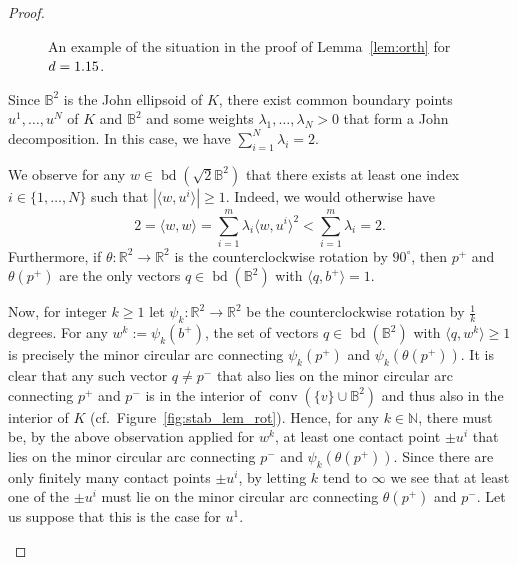 \documentclass[12pt,a4paper]{article}
\theoremstyle{definition}
\DeclareMathOperator{\conv}{conv}
\DeclareMathOperator{\bd}{bd}
\newcommand\R{\mathbb{R}}
\newcommand\B{\mathbb{B}}
\newcommand\N{\mathbb{N}}
\def\ds{1.5/\scale pt}
\begin{document}
\begin{proof}
\begin{figure}[ht]
%
\caption{
An example of the situation in the proof of Lemma~\ref{lem:orth} for $d = \d$.
}
%
\label{fig:stab_lem_points}
\end{figure}



Since $\B^2$ is the John ellipsoid of $K$, there exist common boundary points $u^1, \ldots, u^N$ of $K$ and $\B^2$ and some weights $\lambda_1, \ldots, \lambda_N > 0$ that form a John decomposition. In this case, we have $\sum_{i=1}^N \lambda_i = 2$.

We observe for any $w \in \bd(\sqrt{2} \B^2)$ that there exists at least one index $i \in \{1, \ldots, N\}$ such that $|\langle w, u^i \rangle| \geq 1$. Indeed, we would otherwise have
$$ 2 = \langle w, w \rangle = \sum_{i=1}^m \lambda_i \langle w, u^i \rangle^2 < \sum_{i=1}^m \lambda_i = 2. $$
Furthermore, if $\theta: \R^2 \to \R^2$ is the counterclockwise rotation by $90^\circ$, then $p^+$ and $\theta(p^+)$ are the only vectors $q \in \bd(\B^2)$ with $\langle q, b^+ \rangle = 1$.

Now, for integer $k \geq 1$ let $\psi_k: \R^2 \to \R^2$ be the counterclockwise rotation by $\frac{1}{k}$ degrees. For any $w^k := \psi_k(b^+)$, the set of vectors $q \in \bd(\B^2)$ with $\langle q, w^k \rangle \geq 1$ is precisely the minor circular arc connecting $\psi_k(p^+)$ and $\psi_k(\theta(p^+))$. It is clear that any such vector $q \neq p^-$ that also lies on the minor circular arc connecting $p^+$ and $p^-$ is in the interior of $\conv(\{v\} \cup \B^2)$ and thus also in the interior of $K$ (cf.~Figure~\ref{fig:stab_lem_rot}). Hence, for any $k \in \N$, there must be, by the above observation applied for $w^k$, at least one contact point $\pm u^i$ that lies on the minor circular arc connecting $p^-$ and $\psi_k(\theta(p^+))$. Since there are only finitely many contact points $\pm u^i$, by letting $k$ tend to $\infty$ we see that at least one of the $\pm u^i$ must lie on the minor circular arc connecting $\theta(p^+)$ and $p^-$. Let us suppose that this is the case for $u^1$.



\begin{figure}[ht]
\def\d{1.15}
\def\deg{20}
\def\scale{3}
%
\centering
{}
\end{figure}
\end{proof}
\end{document}
